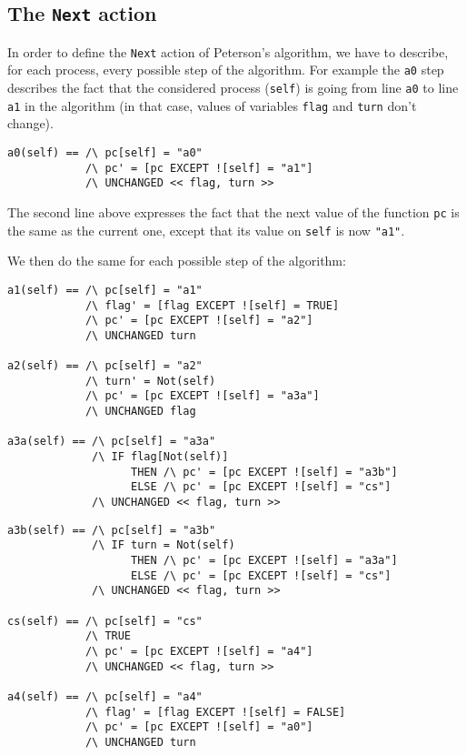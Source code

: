 \documentclass{enonce}
\begin{document}
\subsection{The {\tt Next} action}
In order to define the {\tt Next} action of Peterson's algorithm, we have to describe, for each process, every possible step of the algorithm. For example the {\tt a0} step describes the fact that the considered process ({\tt self}) is going from line {\tt a0} to line {\tt a1} in the algorithm (in that case, values of variables {\tt flag} and {\tt turn} don't change).

\begin{verbatim}
a0(self) == /\ pc[self] = "a0"
            /\ pc' = [pc EXCEPT ![self] = "a1"]
            /\ UNCHANGED << flag, turn >>
\end{verbatim}

\noindent The second line above expresses the fact that the next value of the function {\tt pc} is the same as the current one, except that its value on {\tt self} is now {\tt "a1"}.

\medskip

\noindent We then do the same for each possible step of the algorithm:
\begin{verbatim}
a1(self) == /\ pc[self] = "a1"
            /\ flag' = [flag EXCEPT ![self] = TRUE]
            /\ pc' = [pc EXCEPT ![self] = "a2"]
            /\ UNCHANGED turn

a2(self) == /\ pc[self] = "a2"
            /\ turn' = Not(self)
            /\ pc' = [pc EXCEPT ![self] = "a3a"]
            /\ UNCHANGED flag

a3a(self) == /\ pc[self] = "a3a"
             /\ IF flag[Not(self)]
                   THEN /\ pc' = [pc EXCEPT ![self] = "a3b"]
                   ELSE /\ pc' = [pc EXCEPT ![self] = "cs"]
             /\ UNCHANGED << flag, turn >>

\end{verbatim}
\newpage
\begin{verbatim} 
a3b(self) == /\ pc[self] = "a3b"
             /\ IF turn = Not(self)
                   THEN /\ pc' = [pc EXCEPT ![self] = "a3a"]
                   ELSE /\ pc' = [pc EXCEPT ![self] = "cs"]
             /\ UNCHANGED << flag, turn >>

cs(self) == /\ pc[self] = "cs"
            /\ TRUE
            /\ pc' = [pc EXCEPT ![self] = "a4"]
            /\ UNCHANGED << flag, turn >>

a4(self) == /\ pc[self] = "a4"
            /\ flag' = [flag EXCEPT ![self] = FALSE]
            /\ pc' = [pc EXCEPT ![self] = "a0"]
            /\ UNCHANGED turn
\end{verbatim}
\end{document}
